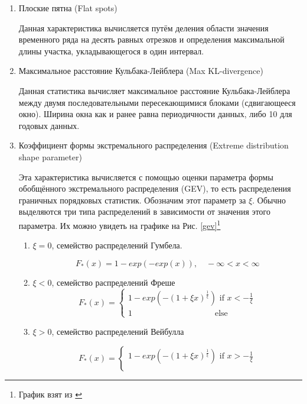 \documentclass[a4paper,12pt]{article}
\begin{document}
\begin{enumerate}
	\item Плоские пятна (Flat spots)
	
	Данная характеристика вычисляется путём деления области значения временного ряда на десять равных отрезков и определения максимальной длины участка, укладывающегося в один интервал.
	
	\item Максимальное расстояние Кульбака-Лейблера (Max KL-divergence)
	
	Данная статистика вычисляет максимальное расстояние Кульбака-Лейблера между двумя последовательными пересекающимися блоками (сдвигающееся окно). Ширина окна как и ранее равна периодичности данных, либо 10 для годовых данных.
	
	\item Коэффициент формы экстремального распределения (Extreme distribution shape parameter)
	
Эта характеристика вычисляется с помощью оценки параметра формы обобщённого экстремального распределения (GEV), то есть распределения граничных порядковых статистик. Обозначим этот параметр за $ \xi $. Обычно выделяются три типа распределений в зависимости от значения этого параметра. Их можно увидеть на графике на Рис. \ref{gev}\footnote{График взят из \cite[стр.~303]{tsay}} \cite[стр.~287]{tsay}
	
	\begin{enumerate}
		\item $  \xi = 0 $, семейство распределений Гумбела. 
		
		\[ F_*(x) = 1 - exp(-exp(x)) ,\quad -\infty < x < \infty \]
		
		\item $  \xi < 0 $, семейство распределений Фреше
		\begin{equation}
		F_*(x) = 
			\begin{cases}
			1 - exp(- (1 +  \xi x)^{\frac{1}{ \xi}}) \text{ if } x < -\frac{1}{ \xi}\\
			
			1 \quad \quad \quad \quad \quad \quad \quad \quad  \quad \quad \text{else}
			\end{cases}
		\end{equation}
		
		\item $  \xi > 0 $, семейство распределений Вейбулла
		
		\begin{equation}
		F_*(x) = 
		\begin{cases}
		1 - exp(- (1 +  \xi x)^{\frac{1}{ \xi}}) \text{ if } x > -\frac{1}{ \xi}\\
		

\end{cases}
\end{equation}
\end{enumerate}
\end{enumerate}
\end{document}
